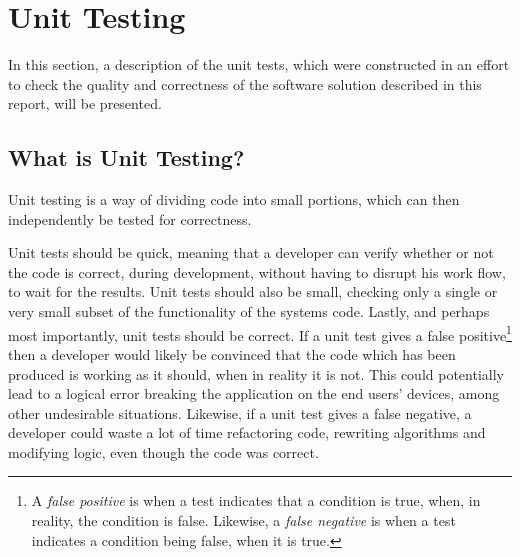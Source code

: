 \section{Unit Testing}
\label{unitTesting}
In this section, a description of the unit tests, which were constructed in an effort to check the quality and correctness of the software solution described in this report, will be presented.

\subsection{What is Unit Testing?}
Unit testing is a way of dividing code into small portions, which can then independently be tested for correctness\cite{unittesting}.

Unit tests should be quick, meaning that a developer can verify whether or not the code is correct, during development, without having to disrupt his work flow, to wait for the results. 
Unit tests should also be small, checking only a single or very small subset of the functionality of the systems code. 
Lastly, and perhaps most importantly, unit tests should be correct. If a unit test gives a false positive\footnote{A \emph{false positive} is when a test indicates that a condition is true, when, in reality, the condition is false. Likewise, a \emph{false negative} is when a test indicates a condition being false, when it is true.} then a developer would likely be convinced that the code which has been produced is working as it should, when in reality it is not. This could potentially lead to a logical error breaking the application on the end users' devices, among other undesirable situations. Likewise, if a unit test gives a false negative, a developer could waste a lot of time refactoring code, rewriting algorithms and modifying logic, even though the code was correct.


